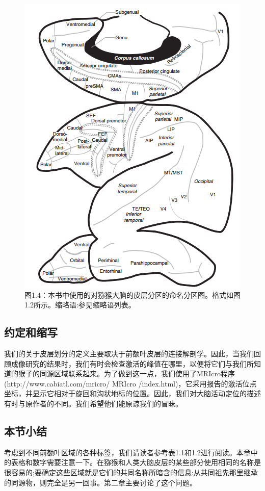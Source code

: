 \begin{figure}[!htb]
	\centering
	\includegraphics[width=0.5\linewidth]{image_pfc/Fig_1_4}
	\caption{图1.4：本书中使用的对猕猴大脑的皮层分区的命名分区图。格式如图1.2所示。缩略语:参见缩略语列表。\label{fig:fig_1_4}}
\end{figure}




\subsection{约定和缩写}
我们的关于皮层划分的定义主要取决于前额叶皮层的连接解剖学。因此，当我们回顾成像研究的结果时，我们有时会检查激活的峰值在哪里，以便将它们与我们所知道的猴子的同源区域联系起来。为了做到这一点，我们使用了MRIcro程序(http://www.cabiatl.com/mricro/ MRIcro /index.html)，它采用报告的激活位点坐标，并显示它相对于旋回和沟状地标的位置。因此，我们对大脑活动定位的描述有时与原作者的不同。我们希望他们能原谅我们的冒昧。

\subsection{本节小结}
考虑到不同前额叶区域的各种标签，我们请读者参考表1.1和1.2进行阅读。本章中的表格和数字需要注意一下。在猕猴和人类大脑皮层的某些部分使用相同的名称是很容易的;要确定这些区域就是它们的共同名称所暗含的信息:从共同祖先那里继承的同源物，则完全是另一回事。第二章主要讨论了这个问题。

